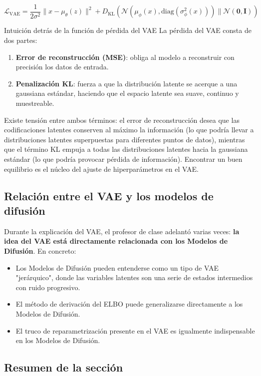 \documentclass[a4paper]{article}
\begin{document}
$$\mathcal{L}_{\text{VAE}} = \frac{1}{2\sigma^2}\|x - \mu_\theta(z)\|^2 + D_{\mathrm{KL}}(\mathcal{N}(\mu_\phi(x), \text{diag}(\sigma^2_\phi(x))) \| \mathcal{N}(\mathbf{0}, \mathbf{I}))$$

\begin{importantbox}{Intuición detrás de la función de pérdida del VAE}
La pérdida del VAE consta de dos partes:
\begin{enumerate}
    \item \textbf{Error de reconstrucción (MSE)}: obliga al modelo a reconstruir con precisión los datos de entrada.
    \item \textbf{Penalización KL}: fuerza a que la distribución latente se acerque a una gaussiana estándar, haciendo que el espacio latente sea suave, continuo y muestreable.
\end{enumerate}
Existe tensión entre ambos términos: el error de reconstrucción desea que las codificaciones latentes conserven al máximo la información (lo que podría llevar a distribuciones latentes superpuestas para diferentes puntos de datos), mientras que el término KL empuja a todas las distribuciones latentes hacia la gaussiana estándar (lo que podría provocar pérdida de información). Encontrar un buen equilibrio es el núcleo del ajuste de hiperparámetros en el VAE.
\end{importantbox}

\subsection{Relación entre el VAE y los modelos de difusión}

Durante la explicación del VAE, el profesor de clase adelantó varias veces: \textbf{la idea del VAE está directamente relacionada con los Modelos de Difusión}. En concreto:

\begin{itemize}
    \item Los Modelos de Difusión pueden entenderse como un tipo de VAE "jerárquico", donde las variables latentes son una serie de estados intermedios con ruido progresivo.
    \item El método de derivación del ELBO puede generalizarse directamente a los Modelos de Difusión.
    \item El truco de reparametrización presente en el VAE es igualmente indispensable en los Modelos de Difusión.
\end{itemize}

\subsection{Resumen de la sección}
\end{document}
